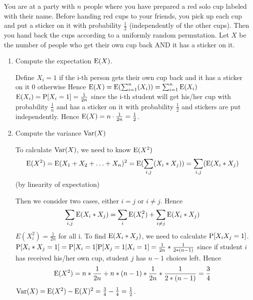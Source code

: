 \question You are at a party with $n$ people where you have prepared a 
red solo cup labeled with their name. Before handing red cups to your 
friends, you pick up each cup and put a sticker on it with probability 
$\frac{1}{2}$ (independently of the other cups). Then you hand back the 
cups according to a uniformly random permutation. Let $X$ be the number 
of people who get their own cup back AND it has a sticker on it.
\begin{enumerate}[label=(\alph*)]
\item Compute the expectation $\E(X)$.
        \begin{solution}[3cm]
Define $X_i =     1$ if the i-th person gets their own cup back and it 
has a sticker on it 0 otherwise 
Hence $\E(X) = \E(\sum_{i=1}^{n}(X_i)) = \sum_{i=1}^{n} \E(X_i) $
$\E(X_i) = \P[X_i = 1] = \frac{1}{2n}$ since the i-th student will get 
his/her cup with probability $\frac{1}{n}$ and has a sticker on it with 
probability $\frac{1}{2}$ and stickers are put independently. 
Hence $\E(X) = n \cdot \frac{1}{2n} = \frac{1}{2}$.
\end{solution}

\item Compute the variance $\var(X)$
    \begin{solution}[6cm]
To calculate $\var(X)$, we need to know $\E(X^2)$
\begin{equation*}
\E(X^2) = \E (X_1 + X_2 + \dotsc + X_n)^2  = \E(\sum_{i, j}(X_i * X_j) ) = 
\sum_{i,j} (\E(X_i * X_j )
\end{equation*} (by linearity of expectation) 

Then we consider two cases, either $i = j$ or $i \neq j.$ 
Hence 
\begin{equation*}
\sum_{i,j} \E(X_i * X_j) = \sum_{i} \E(X_i^2) + \sum_ {i \neq j} \E(X_i * X_j ) 
\end{equation*}
$E(X_i^2) = \frac{1}{2n}$ for all i. 
To find $\E(X_i * X_j  )$, we need to calculate $\P[X_iX_j = 1]$. 
$\P[X_i * X_j  = 1] = \P[X_i = 1] \P[X_j = 1 | X_i = 1] = \frac{1}{2n} * \frac{1}{2 * (n-1)}$ since if student $i$ has received his/her own cup, student $j$ has $n - 1$ choices left. 
Hence 
\begin{equation*}
\E(X^2 ) = n * \frac{1}{2n} + n * (n - 1) * \frac{1}{2n} * \frac{1}{2 * (n-1)}= 
\frac{3}{4}
\end{equation*}
$\var(X) = \E(X^2 ) - \E(X)^2 = \frac{3}{4} - \frac{1}{4} = \frac{1}{2} $.
\end{solution}
\end{enumerate}
